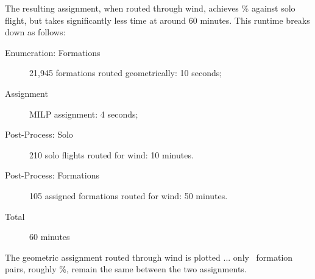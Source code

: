 		 	The resulting assignment, when routed through wind, achieves \ValGeoWindpcWE$\%$ against solo flight, but takes significantly less time at around 60 minutes. This runtime breaks down as follows: 
			\begin{samepage}
		 	\begin{description}
			 	\item[Enumeration: Formations] 21,945 formations routed geometrically: 10 seconds; 
			 	\item[Assignment] MILP assignment: 4 seconds; 
			 	\item[Post-Process: Solo] 210 solo flights routed for wind: 10 minutes.
			 	\item[Post-Process: Formations] 105 assigned formations routed for wind: 50 minutes.
			 	\item[Total] 60 minutes
		 	\end{description}
		 	\end{samepage}
		 	The geometric assignment routed through wind is plotted ... only \ValSameFormWE\ formation pairs, roughly \ValSameFormpcWE\%, remain the same between the two assignments.
		 	
		





